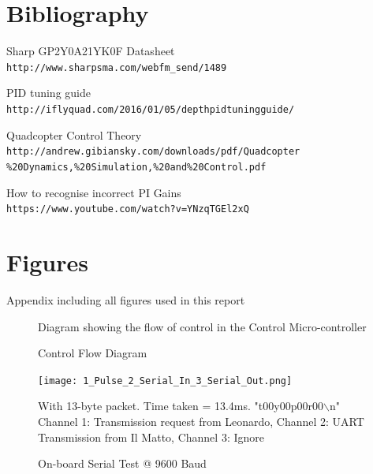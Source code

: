 \documentclass[a4paper,11pt]{article}
\begin{document}
\appendix
\newpage
\section{Bibliography}
\begin{thebibliography}{9}
 
Sharp GP2Y0A21YK0F Datasheet\\
\texttt{http://www.sharpsma.com/webfm\_send/1489}

PID tuning guide\\
\texttt{http://iflyquad.com/2016/01/05/depth\-pid\-tuning\-guide/}

Quadcopter Control Theory\\
\texttt{http://andrew.gibiansky.com/downloads/pdf/Quadcopter\\\%20Dynamics,\%20Simulation,\%20and\%20Control.pdf}

How to recognise incorrect PI Gains\\
\texttt{https://www.youtube.com/watch?v=YNzqTGEl2xQ}



\end{thebibliography}

\newpage
\section{Figures}
\label{app:Figures}
Appendix including all figures used in this report
\begin{figure}[!h]
    
    \caption{Control Flow Diagram}
    \medskip
    \small
    Diagram showing the flow of control in the Control Micro-controller
    \label{fig:Control Flow}
\end{figure}
\newpage
\begin{figure}[!ht]
    \texttt{[image: 1\_Pulse\_2\_Serial\_In\_3\_Serial\_Out.png]}
    \caption{On-board Serial Test @ 9600 Baud}
    \medskip
    \small
    \centering
    With 13-byte packet. Time taken = 13.4ms. "t00y00p00r00$\backslash$n"\\ Channel 1: Transmission request from Leonardo, Channel 2: UART Transmission from Il Matto, Channel 3: Ignore 
    \label{fig:9600 Baud}
\end{figure}
\end{document}
